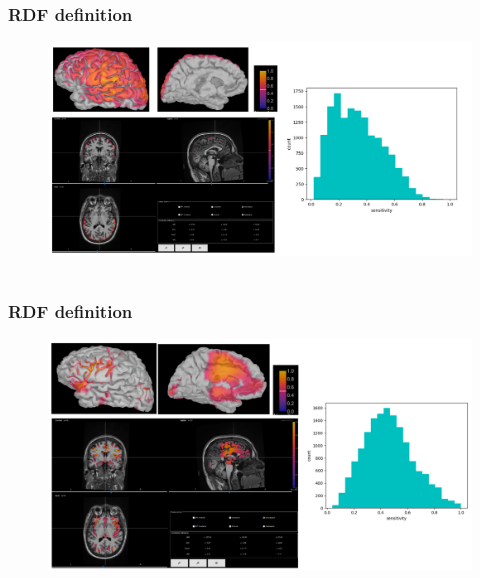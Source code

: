 \documentclass{beamer}
\numberwithin{figure}{section}
\numberwithin{equation}{section}
\begin{document}
\section{}
\begin{frame}
 \frametitle{RDF definition}
	\begin{figure}[p]
  		\centering
  		\includegraphics[width=1\linewidth]{pictures/opmsen11}
  		\label{fig:approaches_RDF}
 	\end{figure}

  
\end{frame}
\section{}
\begin{frame}
 \frametitle{RDF definition}
	\begin{figure}[p]
  		\centering
  		\includegraphics[width=1\linewidth]{pictures/opmsen22}
  		\label{fig:approaches_RDF}
 	\end{figure}

  
\end{frame}
\end{document}
